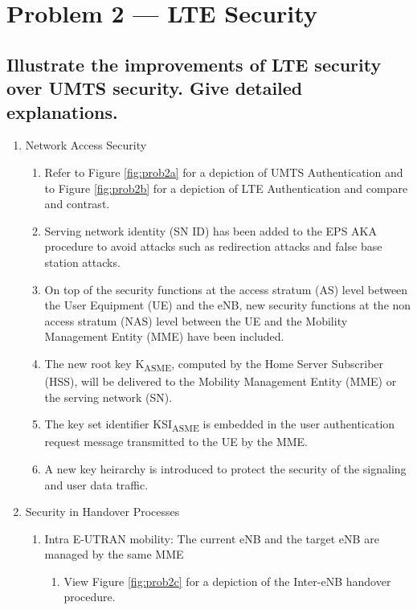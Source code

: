 \documentclass[a4paper]{report}
\begin{document}
\section{Problem 2 --- LTE Security}

\subsection{Illustrate the improvements of LTE security over UMTS security.
            Give detailed explanations.}

\begin{enumerate}
\item Network Access Security
    \begin{enumerate}
    \item Refer to Figure \ref{fig:prob2a} for a depiction of UMTS Authentication and to Figure \ref{fig:prob2b} for a depiction
             of LTE Authentication and compare and contrast.
    \item Serving network identity (SN ID) has been added to the EPS AKA procedure to avoid attacks 
             such as redirection attacks and false base station attacks.
    \item On top of the security functions at the access stratum (AS) level between the User Equipment
             (UE) and the eNB, new security functions at the non access stratum (NAS) level between the 
             UE and the Mobility Management Entity (MME) have been included.
    \item The new root key K\textsubscript{ASME}, computed by the Home Server Subscriber (HSS), will be delivered
             to the Mobility Management Entity (MME) or the serving network (SN).
    \item The key set identifier KSI\textsubscript{ASME} is embedded in the user authentication request message
             transmitted to the UE by the MME.
    \item A new key heirarchy is introduced to protect the security of the signaling and user data traffic.
    \end{enumerate}
\item Security in Handover Processes
    \begin{enumerate}
    \item Intra E-UTRAN mobility: The current eNB and the target eNB are managed by the same MME
        \begin{enumerate}
        \item View Figure \ref{fig:prob2c} for a depiction of the Inter-eNB handover procedure.

\end{enumerate}
\end{enumerate}
\end{enumerate}
\end{document}
